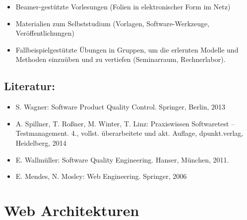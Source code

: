 \begin{itemize}
\tightlist
\item
  Beamer-gestützte Vorlesungen (Folien in elektronischer Form im Netz)
\item
  Materialien zum Selbststudium (Vorlagen, Software-Werkzeuge,
  Veröffentlichungen)
\item
  Fallbeispielgestützte Übungen in Gruppen, um die erlernten Modelle und
  Methoden einzuüben und zu vertiefen (Seminarraum, Rechnerlabor).
\end{itemize}

\section*{Literatur:\label{/mi-2017/modulbeschreibungen-master/MA_WTW_Modul_QUS_Winter}}\label{literaturpathlabelmi-2017modulbeschreibungen-mastermaux5fwtwux5fmodulux5fqusux5fwinter}

\begin{itemize}
\tightlist
\item
  S. Wagner: Software Product Quality Control. Springer, Berlin, 2013
\item
  A. Spillner, T. Roßner, M. Winter, T. Linz: Praxiswissen Softwaretest
  -- Testmanagement. 4., vollst. überarbeitete und akt. Auflage,
  dpunkt.verlag, Heidelberg, 2014
\item
  E. Wallmüller: Software Quality Engineering. Hanser, München, 2011.
\item
  E. Mendes, N. Mosley: Web Engineering. Springer, 2006
\end{itemize}

\chapter{Web
Architekturen\label{/mi-2017/modulbeschreibungen-master/MA_WTW_Modul_Web-Architekturen}}\label{web-architekturenpathlabelmi-2017modulbeschreibungen-mastermaux5fwtwux5fmodulux5fweb-architekturen}

